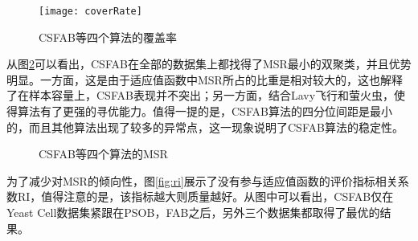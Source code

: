     \begin{figure}[htbp]
        \centering
        \texttt{[image: coverRate]}
        \caption{CSFAB等四个算法的覆盖率}
        \label{fig:coverRate}
    \end{figure}
    从图\ref{fig:msr}可以看出，CSFAB在全部的数据集上都找得了MSR最小的双聚类，并且优势明显。一方面，这是由于适应值函数中MSR所占的比重是相对较大的，这也解释了在样本容量上，CSFAB表现并不突出；另一方面，结合Lavy飞行和萤火虫，使得算法有了更强的寻优能力。值得一提的是，CSFAB算法的四分位间距是最小的，而且其他算法出现了较多的异常点，这一现象说明了CSFAB算法的稳定性。

    \begin{figure}[htbp]
    \setlength{\subfigcapskip}{-1bp}
    \centering
    \begin{minipage}{.8\textwidth}
    \centering
    \subfigure{\label{fig:msr_bcll}}\addtocounter{subfigure}{-2}
    \hspace{.2em}
    \subfigure{\label{fig:msr_yc}}\addtocounter{subfigure}{-2}
    \end{minipage}
    \centering
    \begin{minipage}{.8\textwidth}
    \centering
    \hspace{.2em}
    \subfigure{\label{fig:msr_pbc}}\addtocounter{subfigure}{-2}
    \hspace{.2em}
    \subfigure{\label{fig:msr_rat}}\addtocounter{subfigure}{-2}
    \end{minipage}
    \vspace{0.2em}
    \caption{CSFAB等四个算法的MSR}
    \label{fig:msr}
    \end{figure}

    为了减少对MSR的倾向性，图\ref{fig:ri}展示了没有参与适应值函数的评价指标相关系数RI，值得注意的是，该指标越大则质量越好。从图中可以看出，CSFAB仅在Yeast Cell数据集紧跟在PSOB，FAB之后，另外三个数据集都取得了最优的结果。

